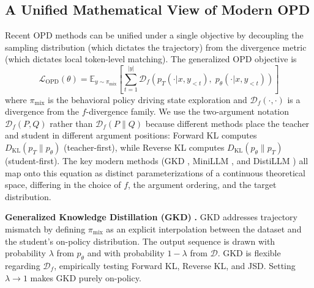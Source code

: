 \documentclass{article} %
\newcommand{\KL}{D_{\mathrm{KL}}}
\newcommand{\ptheta}{p_\theta}
\newcommand{\pteacher}{p_T}
\newcommand{\loss}{\mathcal{L}}
\begin{document}
\subsection{A Unified Mathematical View of Modern OPD}
\label{subsec:unified_view}

Recent OPD methods can be unified under a single objective by decoupling the sampling distribution (which dictates the trajectory) from the divergence metric (which dictates local token-level matching). The generalized OPD objective is
\begin{equation}
    \loss_{\mathrm{OPD}}(\theta) = \mathbb{E}_{y \sim \pi_{\mathrm{mix}}} \left[ \sum_{t=1}^{|y|} \mathcal{D}_f \left( \pteacher(\cdot | x, y_{<t}),\; \ptheta(\cdot | x, y_{<t}) \right) \right]
\end{equation}
where $\pi_{\mathrm{mix}}$ is the behavioral policy driving state exploration and $\mathcal{D}_f(\cdot, \cdot)$ is a divergence from the $f$-divergence family. We use the two-argument notation $\mathcal{D}_f(P, Q)$ rather than $\mathcal{D}_f(P \| Q)$ because different methods place the teacher and student in different argument positions: Forward KL computes $\KL(\pteacher \| \ptheta)$ (teacher-first), while Reverse KL computes $\KL(\ptheta \| \pteacher)$ (student-first). The key modern methods (GKD \citep{2306.13649}, MiniLLM \citep{2306.08543}, and DistiLLM \citep{2402.03898}) all map onto this equation as distinct parameterizations of a continuous theoretical space, differing in the choice of $f$, the argument ordering, and the target distribution.

\textbf{Generalized Knowledge Distillation (GKD)} \citep{2306.13649}\textbf{.} GKD addresses trajectory mismatch by defining $\pi_{\mathrm{mix}}$ as an explicit interpolation between the dataset and the student's on-policy distribution. The output sequence is drawn with probability $\lambda$ from $\ptheta$ and with probability $1-\lambda$ from $\mathcal{D}$. GKD is flexible regarding $\mathcal{D}_f$, empirically testing Forward KL, Reverse KL, and JSD. Setting $\lambda \to 1$ makes GKD purely on-policy.
\end{document}
